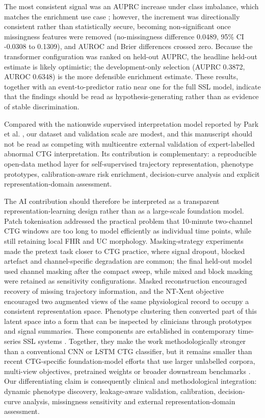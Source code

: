 \documentclass[11pt]{article}
\begin{document}
The most consistent signal was an AUPRC increase under class imbalance, which matches the enrichment use case \cite{davis2006}; however, the increment was directionally consistent rather than statistically secure, becoming non-significant once missingness features were removed (no-missingness difference 0.0489, 95\% CI -0.0308 to 0.1309), and AUROC and Brier differences crossed zero. Because the transformer configuration was ranked on held-out AUPRC, the headline held-out estimate is likely optimistic; the development-only selection (AUPRC 0.3872, AUROC 0.6348) is the more defensible enrichment estimate. These results, together with an event-to-predictor ratio near one for the full SSL model, indicate that the findings should be read as hypothesis-generating rather than as evidence of stable discrimination.

Compared with the nationwide supervised interpretation model reported by Park et al. \cite{park2025nationwide}, our dataset and validation scale are modest, and this manuscript should not be read as competing with multicentre external validation of expert-labelled abnormal CTG interpretation. Its contribution is complementary: a reproducible open-data method layer for self-supervised trajectory representation, phenotype prototypes, calibration-aware risk enrichment, decision-curve analysis and explicit representation-domain assessment.

The AI contribution should therefore be interpreted as a transparent representation-learning design rather than as a large-scale foundation model. Patch tokenisation addressed the practical problem that 10-minute two-channel CTG windows are too long to model efficiently as individual time points, while still retaining local FHR and UC morphology. Masking-strategy experiments made the pretext task closer to CTG practice, where signal dropout, blocked artefact and channel-specific degradation are common; the final held-out model used channel masking after the compact sweep, while mixed and block masking were retained as sensitivity configurations. Masked reconstruction encouraged recovery of missing trajectory information, and the NT-Xent objective encouraged two augmented views of the same physiological record to occupy a consistent representation space. Phenotype clustering then converted part of this latent space into a form that can be inspected by clinicians through prototypes and signal summaries. These components are established in contemporary time-series SSL systems \cite{nie2023,yue2022,zhang2022tfc,goswami2024moment}. Together, they make the work methodologically stronger than a conventional CNN or LSTM CTG classifier, but it remains smaller than recent CTG-specific foundation-model efforts that use larger unlabelled corpora, multi-view objectives, pretrained weights or broader downstream benchmarks \cite{fridman2026ctgfoundation,prismctg2026}. Our differentiating claim is consequently clinical and methodological integration: dynamic phenotype discovery, leakage-aware validation, calibration, decision-curve analysis, missingness sensitivity and external representation-domain assessment.
\end{document}
